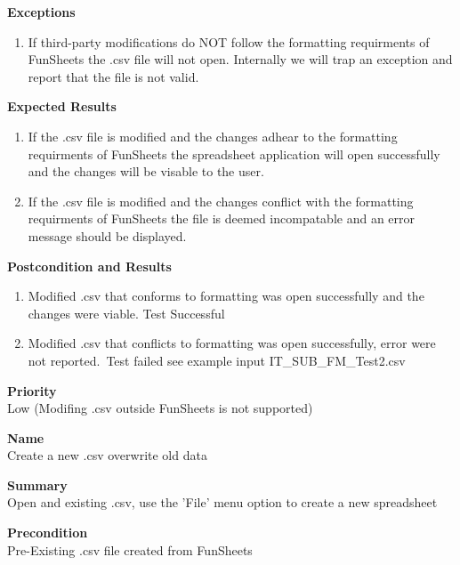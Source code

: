 \documentclass[12pt]{article}
\begin{document}
\noindent
{\bf Exceptions}\
\begin{enumerate}
\item If third-party modifications do NOT follow the formatting requirments of FunSheets the .csv file will not open. Internally we will trap an exception and report that the file is not valid.
\end{enumerate}

{\bf Expected Results}\\
\begin{enumerate}
\item If the .csv file is modified and the changes adhear to the formatting requirments of FunSheets the spreadsheet application will open successfully and the changes will be visable to the user. 
\item If the .csv file is modified and the changes conflict with the formatting requirments of FunSheets the file is deemed incompatable and an error message should be displayed.
\end{enumerate}

\noindent

{\bf Postcondition and Results}\\
\begin{enumerate}
\item Modified .csv that conforms to formatting was open successfully and the changes were viable. Test Successful
\item Modified .csv that conflicts to formatting was open successfully, error were not reported.\ 
Test failed see example input IT\_SUB\_FM\_Test2.csv
\end{enumerate}

\noindent
{\bf Priority}\\
Low (Modifing .csv outside FunSheets is not supported)
\noindent

\clearpage


\noindent
{\bf Name}\\
Create a new .csv overwrite old data

\noindent
{\bf Summary}\\
Open and existing .csv, use the 'File' menu option to create a new spreadsheet

\noindent
{\bf Precondition}\\
Pre-Existing .csv file created from FunSheets
\end{document}
